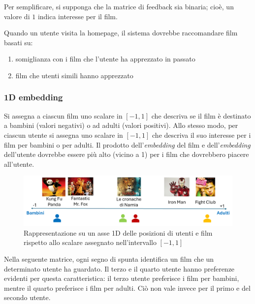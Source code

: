 Per semplificare, si supponga che la matrice di feedback sia binaria; cioè, un valore di $1$ indica interesse per il film.

Quando un utente visita la homepage, il sistema dovrebbe raccomandare film basati su:

\begin{enumerate}
    \item somiglianza con i film che l'utente ha apprezzato in passato
    \item film che utenti simili hanno apprezzato
\end{enumerate}

\subsubsection{1D embedding}

Si assegna a ciascun film uno scalare in $[-1, 1]$ che descriva se il film è destinato a bambini (valori negativi) o ad adulti (valori positivi). Allo stesso modo, per ciascun utente si assegna uno scalare in $[-1, 1]$ che descriva il suo interesse per i film per bambini o per adulti. Il prodotto dell'\textit{embedding} del film e dell'\textit{embedding} dell'utente dovrebbe essere più alto (vicino a 1) per i film che dovrebbero piacere all'utente.

\begin{figure}[H]
    \centering
    \includegraphics[scale=0.4]{figures/collaborative_filtering/embeddings.PNG}
    \caption{Rappresentazione su un asse 1D delle posizioni di utenti e film rispetto allo scalare assegnato nell'intervallo $[-1, 1]$}
    \label{fig:embeddings}
\end{figure}

Nella seguente matrice, ogni segno di spunta identifica un film che un determinato utente ha guardato. Il terzo e il quarto utente hanno preferenze evidenti per questa caratteristica: il terzo utente preferisce i film per bambini, mentre il quarto preferisce i film per adulti. Ciò non vale invece per il primo e del secondo utente.

